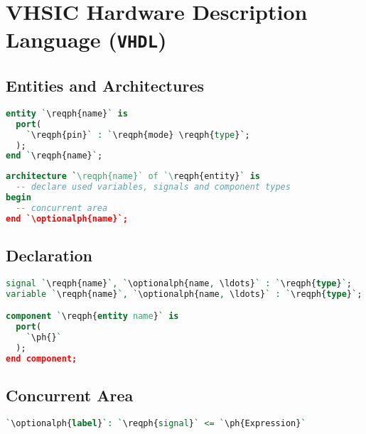 \section{VHSIC Hardware Description Language (\texttt{VHDL})}

\newcommand{\ph}[1]{\textrm{\textit{#1}}}
\newcommand{\reqph}[1]{\textrm{\textlangle\,\ph{#1}\,\textrangle}}
\newcommand{\optionalph}[1]{\textrm{[\,\ph{#1}\,]}}

\subsection{Entities and Architectures}

\begin{lstlisting}[language=vhdl]
entity `\reqph{name}` is
  port(
    `\reqph{pin}` : `\reqph{mode} \reqph{type}`;
  );
end `\reqph{name}`;
\end{lstlisting}

\begin{lstlisting}[language=vhdl]
architecture `\reqph{name}` of `\reqph{entity}` is
  -- declare used variables, signals and component types
begin
  -- concurrent area
end `\optionalph{name}`;
\end{lstlisting}

\subsection{Declaration}
\begin{lstlisting}[language=vhdl]
signal `\reqph{name}`, `\optionalph{name, \ldots}` : `\reqph{type}`;
variable `\reqph{name}`, `\optionalph{name, \ldots}` : `\reqph{type}`;

component `\reqph{entity name}` is
  port(
    `\ph{}`
  );
end component;
\end{lstlisting}

\subsection{Concurrent Area}

\begin{lstlisting}[language=vhdl]
`\optionalph{label}`: `\reqph{signal}` <= `\ph{Expression}`
\end{lstlisting}

